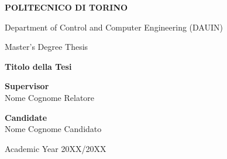\begin{center}\thispagestyle{empty}
    \Huge\textbf{POLITECNICO DI TORINO}\par
    \bigskip
    \Large{Department of Control and Computer Engineering (DAUIN)}\par
    \bigskip
    \bigskip
    \bigskip
    \LARGE
    {Master's Degree Thesis}\par
    \bigskip
    \bigskip
    \bigskip
    \huge\bfseries{Titolo della Tesi}\par

    \vspace{1.5cm}
    \vspace{1.5cm}

    \normalsize

    \Large\begin{minipage}{2in}
        \textbf{Supervisor} \\
        \textnormal{Nome Cognome Relatore}
    \end{minipage}
        \hfill
    \Large\begin{minipage}{2in}
        \textbf{Candidate} \\
        \textnormal{Nome Cognome Candidato}
    \end{minipage}

    \normalsize
\end{center}

\vfill

\begin{center}
    \Large{Academic Year 20XX/20XX}
\end{center}